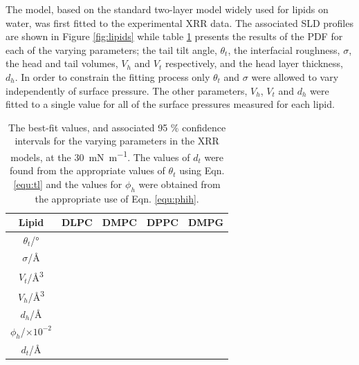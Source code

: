 \documentclass[twocolumn,a4paper]{paper}
\begin{document}
The model, based on the standard two-layer model widely used for lipids on water, was first fitted to the experimental XRR data.
The associated SLD profiles are shown in Figure \ref{fig:lipids} while table \ref{tab:liptab} presents the results of the PDF for each of the varying parameters; the tail tilt angle, $\theta_t$, the interfacial roughness, $\sigma$, the head and tail volumes, $V_h$ and $V_t$ respectively, and the head layer thickness, $d_h$.
In order to constrain the fitting process only $\theta_t$ and $\sigma$ were allowed to vary independently of surface pressure. The other parameters, $V_h$, $V_t$ and $d_h$ were fitted to a single value for all of the surface pressures measured for each lipid.

%
\begin{table}
  \centering
	\caption{\label{tab:liptab} The best-fit values, and associated 95 \% confidence intervals for the varying parameters in the XRR models, at the \SI{30}{\milli\newton\per\meter}. The values of $d_t$ were found from the appropriate values of $\theta_t$ using Eqn. \ref{equ:tl} and the values for $\phi_h$ were obtained from the appropriate use of Eqn. \ref{equ:phih}.}
	\begin{tabular}{ccccc}
		Lipid & DLPC & DMPC & DPPC & DMPG \\
		\hline
		$\theta_t$/\si{\degree} &  &  &  &  \\
		$\sigma$/\si{\angstrom} &  &  &  &  \\
    \hline
    $V_t$/\si{\cubic\angstrom} &  &  &  &  \\
		$V_h$/\si{\cubic\angstrom} &  &  &  &  \\
		$d_h$/\si{\angstrom} &  &  &  &  \\
    \hline
    $\phi_h$/$\times10^{-2}$ &  &  &  &  \\
		$d_t$/\si{\angstrom} &  &  &  &  \\
	\end{tabular}
\end{table}
%
\end{document}
